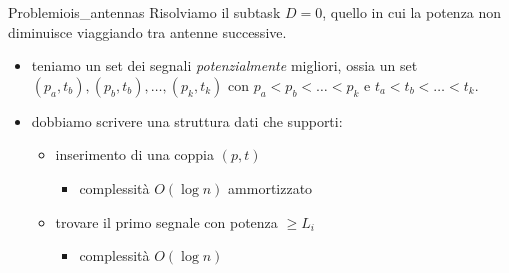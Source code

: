 \documentclass[compress]{beamer}
\begin{document}
\begin{frame}{Problemi}{ois\_antennas}
    Risolviamo il subtask $D = 0$, quello in cui la potenza non diminuisce viaggiando tra antenne successive.
    \begin{itemize}
        \item teniamo un set dei segnali \textit{potenzialmente} migliori, ossia un set $(p_a, t_b), (p_b, t_b), \dots , (p_k, t_k)$ con $p_a < p_b < \dots < p_k$ e $t_a < t_b < \dots < t_k$.
        \pause
        \item dobbiamo scrivere una struttura dati che supporti:
        \pause
        \begin{itemize}
            \item inserimento di una coppia $(p, t)$
            \begin{itemize}
                \item complessit\`a $O(\log n)$ ammortizzato
            \end{itemize}
            \pause
            \item trovare il primo segnale con potenza $\geq L_i$
            \begin{itemize}
                \item complessit\`a $O(\log n)$
            \end{itemize}
        \end{itemize}
    \end{itemize}
\end{frame}

\begin{frame}{}
\end{frame}
\end{document}
